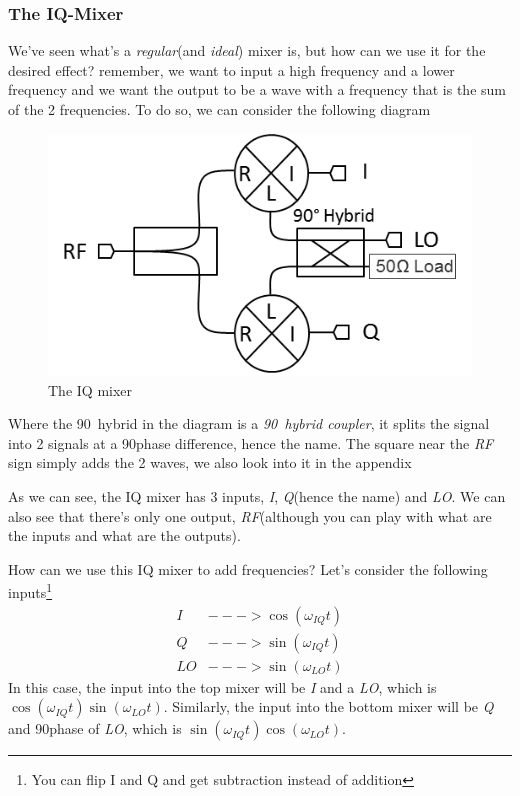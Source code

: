 \documentclass[english, a4paper, 12pt, twoside]{article}
\numberwithin{equation}{section} %
\begin{document}
\subsubsection{The IQ-Mixer}
We've seen what's a \textit{regular}(and \textit{ideal}) mixer is, but how can we use it for the desired effect? remember, we want to input a high frequency and a lower frequency and we want the output to be a wave with a frequency that is the sum of the 2 frequencies. To do so, we can consider the following diagram
\begin{figure}[H]
    \centering
    \includegraphics[width=0.5\columnwidth]{IQ-Mixer.png} %
    \caption{The IQ mixer}
    \label{fig:IQ-Mixer}
\end{figure}
Where the 90\degree\ hybrid in the diagram is a \textit{90\degree\  hybrid coupler}, it splits the signal into 2 signals at a 90\degree phase difference, hence the name. The square near the \textit{RF} sign simply adds the 2 waves, we also look into it in the appendix %

As we can see, the IQ mixer has 3 inputs, \textit{I}, \textit{Q}(hence the name) and \textit{LO}. We can also see that there's only one output, \textit{RF}(although you can play with what are the inputs and what are the outputs).

How can we use this IQ mixer to add frequencies? Let's consider the following inputs\footnote{You can flip I and Q and get subtraction instead of addition}
\begin{align*}
    I &---> \cos(\omega_{IQ} t)\\
    Q &---> \sin(\omega_{IQ} t)\\
    LO &---> \sin(\omega_{LO}t)
\end{align*}
In this case, the input into the top mixer will be \textit{I} and a \textit{LO}, which is $\cos(\omega_{IQ}t)\sin(\omega_{LO}t)$. Similarly, the input into the bottom mixer will be \textit{Q} and 90\degree phase of \textit{LO}, which is $\sin(\omega_{IQ}t)\cos(\omega_{LO}t)$.
\end{document}

